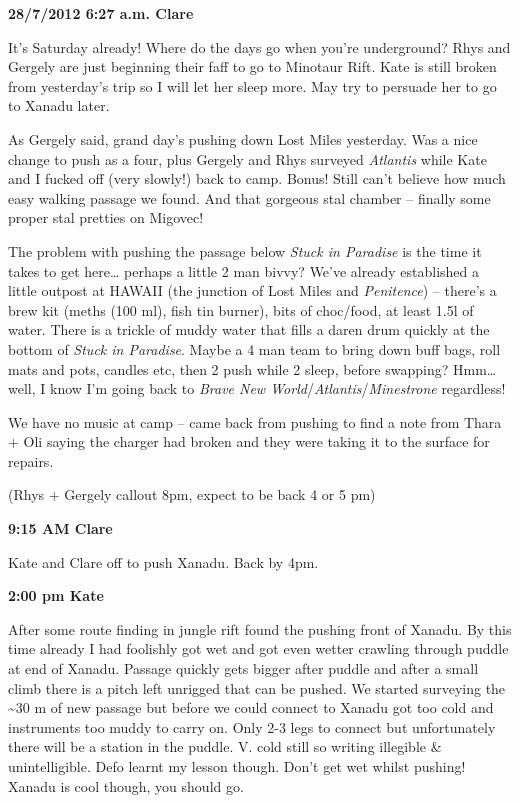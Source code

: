 \textbf{28/7/2012 6:27 a.m. Clare}

It's Saturday already! Where do the days go when you're underground?
Rhys and Gergely are just beginning their faff to go to Minotaur Rift.
Kate is still broken from yesterday's trip so I will let her sleep more.
May try to persuade her to go to Xanadu later.

As Gergely said, grand day's pushing down Lost Miles yesterday. Was a
nice change to push as a four, plus Gergely and Rhys surveyed
\emph{Atlantis} while Kate and I fucked off (very slowly!) back to camp.
Bonus! Still can't believe how much easy walking passage we found. And
that gorgeous stal chamber -- finally some proper stal pretties on
Migovec!

The problem with pushing the passage below \emph{Stuck in Paradise} is
the time it takes to get here\ldots{} perhaps a little 2 man bivvy?
We've already established a little outpost at HAWAII (the junction of
Lost Miles and \emph{Penitence}) -- there's a brew kit (meths (100 ml),
fish tin burner), bits of choc/food, at least 1.5l of water. There is a
trickle of muddy water that fills a daren drum quickly at the bottom of
\emph{Stuck in Paradise}. Maybe a 4 man team to bring down buff bags,
roll mats and pots, candles etc, then 2 push while 2 sleep, before
swapping? Hmm\ldots{} well, I know I'm going back to \emph{Brave New
World}/\emph{Atlantis}/\emph{Minestrone} regardless!

We have no music at camp -- came back from pushing to find a note from
Thara + Oli saying the charger had broken and they were taking it to the
surface for repairs.

(Rhys + Gergely callout 8pm, expect to be back 4 or 5 pm)

\textbf{9:15 AM Clare}

Kate and Clare off to push Xanadu. Back by 4pm.

\textbf{2:00 pm Kate}

After some route finding in jungle rift found the pushing front of
Xanadu. By this time already I had foolishly got wet and got even wetter
crawling through puddle at end of Xanadu. Passage quickly gets bigger
after puddle and after a small climb there is a pitch left unrigged that
can be pushed. We started surveying the \textasciitilde 30 m of new
passage but before we could connect to Xanadu got too cold and
instruments too muddy to carry on. Only 2-3 legs to connect but
unfortunately there will be a station in the puddle. V. cold still so
writing illegible \& unintelligible. Defo learnt my lesson though. Don't
get wet whilst pushing! Xanadu is cool though, you should go.

